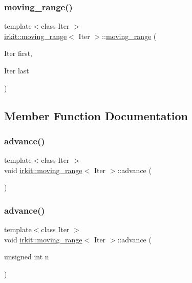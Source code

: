 \subsubsection{\texorpdfstring{moving\+\_\+range()}{moving\_range()}\hspace{0.1cm}{\footnotesize\ttfamily [2/2]}}
{\footnotesize\ttfamily template$<$class Iter $>$ \\
\hyperlink{structirkit_1_1moving__range}{irkit\+::moving\+\_\+range}$<$ Iter $>$\+::\hyperlink{structirkit_1_1moving__range}{moving\+\_\+range} (\begin{DoxyParamCaption}\item[{Iter}]{first,  }\item[{Iter}]{last }\end{DoxyParamCaption})\hspace{0.3cm}{\ttfamily [inline]}}



\subsection{Member Function Documentation}
\mbox{\label{structirkit_1_1moving__range_a5ee65e31d2983395c02b724ede47c034}} 
\subsubsection{\texorpdfstring{advance()}{advance()}\hspace{0.1cm}{\footnotesize\ttfamily [1/2]}}
{\footnotesize\ttfamily template$<$class Iter $>$ \\
void \hyperlink{structirkit_1_1moving__range}{irkit\+::moving\+\_\+range}$<$ Iter $>$\+::advance (\begin{DoxyParamCaption}{ }\end{DoxyParamCaption})\hspace{0.3cm}{\ttfamily [inline]}}

\mbox{\label{structirkit_1_1moving__range_a792efd70f3efcb651bff438a0e0814ce}} 
\subsubsection{\texorpdfstring{advance()}{advance()}\hspace{0.1cm}{\footnotesize\ttfamily [2/2]}}
{\footnotesize\ttfamily template$<$class Iter $>$ \\
void \hyperlink{structirkit_1_1moving__range}{irkit\+::moving\+\_\+range}$<$ Iter $>$\+::advance (\begin{DoxyParamCaption}\item[{unsigned int}]{n }\end{DoxyParamCaption})\hspace{0.3cm}{\ttfamily [inline]}}

